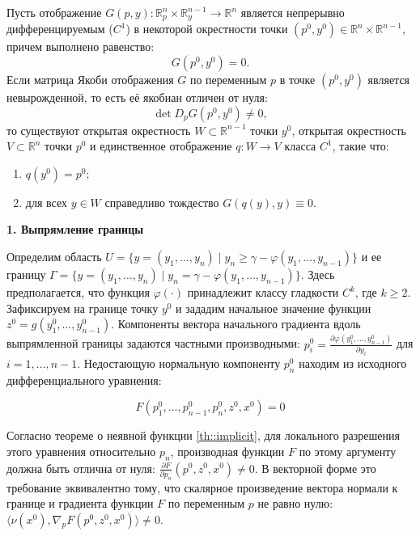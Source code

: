 \begin{theorem} \label{th::implicit}
Пусть отображение $G(p, y) \colon \mathbb{R}^n_p \times \mathbb{R}^{n-1}_y \to \mathbb{R}^n$
является непрерывно дифференцируемым ($C^1$) в некоторой окрестности точки
$(p^0, y^0) \in \mathbb{R}^n \times \mathbb{R}^{n-1}$, причем выполнено равенство:
\begin{equation}
  G(p^0, y^0) = 0.
\end{equation}
Если матрица Якоби отображения $G$ по переменным $p$ в точке $(p^0, y^0)$ является 
невырожденной, то есть её якобиан отличен от нуля:
\begin{equation}
\det D_p G(p^0, y^0) \neq 0,
\end{equation}
то существуют открытая окрестность $W \subset \mathbb{R}^{n-1}$ точки $y^0$,
открытая окрестность $V \subset \mathbb{R}^n$ точки $p^0$ и единственное
  отображение $q \colon W \to V$ класса $C^1$, такие что:
\begin{enumerate}
  \item $q(y^0) = p^0$;
  \item для всех $y \in W$ справедливо тождество $G(q(y), y) \equiv 0$.
\end{enumerate}
\end{theorem}

\textbf{1. Выпрямление границы}

Определим область $U = \{y = (y_1, \dots, y_n) \mid y_n \ge \gamma - \varphi(y_1, \dots, y_{n-1})\}$
и ее границу $\Gamma = \{y = (y_1, \dots, y_n) \mid y_n = \gamma - \varphi(y_1, \dots, y_{n-1})\}$.
Здесь предполагается, что функция $\varphi(\cdot)$ принадлежит классу гладкости $C^k$, где $k \ge 2$.
Зафиксируем на границе точку $y^0$ и зададим начальное значение функции 
$z^0 = g(y_1^0, \dots, y_{n-1}^0)$. Компоненты вектора начального градиента
вдоль выпрямленной границы задаются частными производными: $p_i^0 = \frac{\partial \varphi(y_1^0, \dots, y_{n-1}^0)}{\partial y_i}$ для $i = 1, \dots, n-1$.
Недостающую нормальную компоненту $p_n^0$ находим из исходного дифференциального 
уравнения:


$$F(p_1^0, \dots, p_{n-1}^0, p_n^0, z^0, x^0) = 0$$

Согласно теореме о неявной функции \eqref{th::implicit}, для локального разрешения этого уравнения 
относительно $p_n$, производная функции $F$ по этому аргументу должна быть отлична 
от нуля: $\frac{\partial F}{\partial p_n}(p^0, z^0, x^0) \neq 0$. В векторной 
форме это требование эквивалентно тому, что скалярное произведение вектора 
нормали к границе и градиента функции $F$ по переменным $p$ не равно нулю: 
$\langle \nu(x^0), \nabla_p F(p^0, z^0, x^0) \rangle \neq 0$.

